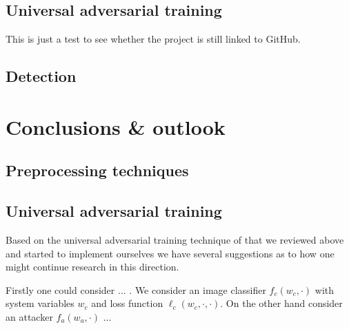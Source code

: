 \documentclass[12pt]{article}
\begin{document}
\subsection{Universal adversarial training}
This is just a test to see whether the project is still linked to GitHub.

\subsection{Detection}

\section{Conclusions \& outlook}

\subsection{Preprocessing techniques}

\subsection{Universal adversarial training}

Based on the universal adversarial training technique of \cite{shafahi_universal_2018} that we reviewed above and started to implement ourselves we have several suggestions as to how one might continue research in this direction. 

Firstly one could consider ... . We consider an image classifier $f_c(w_c,\cdot)$ with system variables $w_c$ and loss function $\ell_c(w_c, \cdot, \cdot)$. On the other hand consider an attacker $f_a(w_a,\cdot)$ ... 
\end{document}
